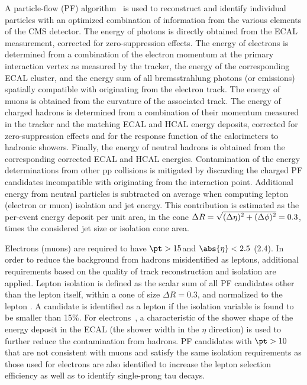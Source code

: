 A particle-flow (PF) algorithm~\cite{PF1,CMS-PAS-PFT-10-001} is used to reconstruct
and identify individual particles with an optimized combination of
information from the various elements of the CMS detector. The energy
of photons is directly obtained from the ECAL measurement, corrected
for zero-suppression effects. The energy of electrons is determined
from a combination of the electron momentum at the primary interaction
vertex as measured by the tracker, the energy of the corresponding
ECAL cluster, and the energy sum of all bremsstrahlung photons (or emissions)
spatially compatible with originating from the electron track. The
energy of muons is obtained from the curvature of the associated
track. The energy of charged hadrons is determined from a combination
of their momentum measured in the tracker and the matching ECAL and
HCAL energy deposits, corrected for zero-suppression effects and for
the response function of the calorimeters to hadronic
showers. Finally, the energy of neutral hadrons is obtained from the
corresponding corrected ECAL and HCAL energies. Contamination of the
energy determinations from other pp collisions is mitigated by
discarding the charged PF candidates incompatible with originating from the interaction point.  Additional
energy from neutral particles is subtracted on average when computing
lepton (electron or muon) isolation and jet energy. This contribution is estimated as the
per-event energy deposit per unit area, in the cone $\Delta R = \sqrt{\smash[b]{(\Delta
  \eta)^2+(\Delta\phi)^2}}=0.3$, times the considered jet size or
isolation cone area.

Electrons (muons) are required to have $\pt>15$\GeV and  $\abs{\eta}<2.5$
(2.4). In order to reduce the
background from hadrons misidentified as leptons, additional
requirements based on the
quality of track reconstruction and isolation are applied. Lepton isolation is
defined as the scalar \pt sum of all PF candidates other than the
lepton itself, within a cone of size $\Delta R = 0.3$, and normalized to the lepton \pt. A
candidate is identified as a lepton if the isolation variable is found to be smaller than 15\%.
For electrons~\cite{ElectronsCMS}, a characteristic of the shower
shape of the energy deposit in the ECAL (the shower width in the
$\eta$ direction) is used to further reduce the contamination from hadrons.
PF candidates with $\pt > 10$\GeV that are not consistent with muons and satisfy the same isolation
requirements as those used for electrons are also identified to increase the 
lepton selection efficiency as well as to identify single-prong tau decays. 


